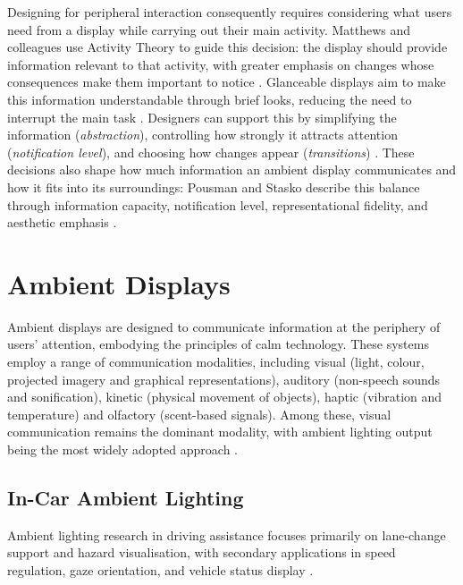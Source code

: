 \documentclass[
english,                 %
bibtex,                  %
includeExtraAbstracts, %
]{kththesis}
\numberwithin{listing}{chapter}
\begin{document}
Designing for peripheral interaction consequently requires considering what users need from a display while carrying out their main activity. Matthews and colleagues use Activity Theory to guide this decision: the display should provide information relevant to that activity, with greater emphasis on changes whose consequences make them important to notice \cite{matthewsDefiningDesigningEvaluating2007}. Glanceable displays aim to make this information understandable through brief looks, reducing the need to interrupt the main task \cite{matthewsDesigningEvaluatingGlanceable2006}. Designers can support this by simplifying the information (\textit{abstraction}), controlling how strongly it attracts attention (\textit{notification level}), and choosing how changes appear (\textit{transitions}) \cite{matthewsToolkitManagingUser2004,matthewsDesigningEvaluatingGlanceable2006}. These decisions also shape how much information an ambient display communicates and how it fits into its surroundings: Pousman and Stasko describe this balance through information capacity, notification level, representational fidelity, and aesthetic emphasis \cite{pousmanTaxonomyAmbientInformation2006}.

\section{Ambient Displays}
\label{sec:ambient-displays-applications}

Ambient displays are designed to communicate information
at the periphery of users' attention, embodying the
principles of calm technology. These systems employ a range of communication modalities, including visual (light, colour, projected imagery and graphical representations), auditory (non-speech sounds and sonification), kinetic (physical movement
of objects), haptic (vibration and temperature) and olfactory (scent-based signals). Among these, visual communication remains the dominant modality, with ambient lighting output being the most widely adopted approach \cite{SheltonNesbitt2020}.

\setcounter{secnumdepth}{2}

\subsection{In-Car Ambient Lighting}
\label{sec:automotive-ambient-displays}

Ambient lighting research in driving assistance focuses primarily on lane-change support and hazard visualisation, with secondary applications in speed regulation, gaze orientation, and vehicle status display \cite{lockenEnlighteningDriversSurvey2016}.
\end{document}
